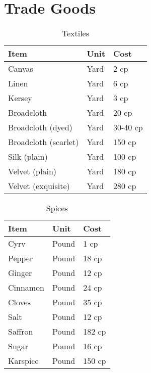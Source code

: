 \documentclass[oneside,11pt,english]{book}
\begin{document}
\section{Trade Goods}
\begin{table}[hb]
  \centering
  \caption{Textiles}
  \label{tab:Textiles}
  \begin{tabu} spread 0pt {*{3}{X[-1]}}
    Item                 & Unit & Cost     \\\toprule
    Canvas               & Yard & 2 cp     \\
    Linen                & Yard & 6 cp     \\
    Kersey               & Yard & 3 cp     \\
    Broadcloth           & Yard & 20 cp    \\
    Broadcloth (dyed)    & Yard & 30-40 cp \\
    Broadcloth (scarlet) & Yard & 150 cp   \\
    Silk (plain)         & Yard & 100 cp   \\
    Velvet (plain)       & Yard & 180 cp   \\
    Velvet (exquisite)   & Yard & 280 cp   \\
  \end{tabu}
\end{table}

\begin{table}[hb]
  \centering
  \caption{Spices}
  \label{tab:Spices}
  \begin{tabu} spread 0pt {*{3}{X[-1]}}
    Item     & Unit  & Cost   \\\toprule
    Cyrv     & Pound & 1 cp   \\
    Pepper   & Pound & 18 cp  \\
    Ginger   & Pound & 12 cp  \\
    Cinnamon & Pound & 24 cp  \\
    Cloves   & Pound & 35 cp  \\
    Salt     & Pound & 12 cp  \\
    Saffron  & Pound & 182 cp \\
    Sugar    & Pound & 16 cp  \\
    Karspice & Pound & 150 cp \\
  \end{tabu}
\end{table}
\end{document}
